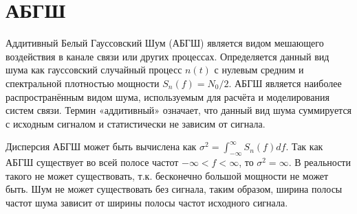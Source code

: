 \section{АБГШ}
\label{sec:awgn}

Аддитивный Белый Гауссовский Шум (АБГШ) является видом мешающего воздействия в канале связи или других процессах. Определяется данный вид шума как гауссовский случайный процесс $n(t )$ с нулевым средним и спектральной плотностью мощности $S_n( f ) = N_0 / 2$. АБГШ является наиболее распространённым видом шума, используемым для расчёта и моделирования систем связи. Термин «аддитивный» означает, что данный вид шума суммируется с исходным сигналом и статистически не зависим от сигнала.

Дисперсия АБГШ может быть вычислена как $\sigma^2 = \int_{-\infty}^{\infty}S_n(f)df$. Так как АБГШ существует во всей полосе частот $-\infty < f < \infty$, то $\sigma^2 = \infty$. В реальности такого не может существовать, т.к. бесконечно большой мощности не может быть. Шум не может существовать без сигнала, таким образом, ширина полосы частот шума зависит от ширины полосы частот исходного сигнала.